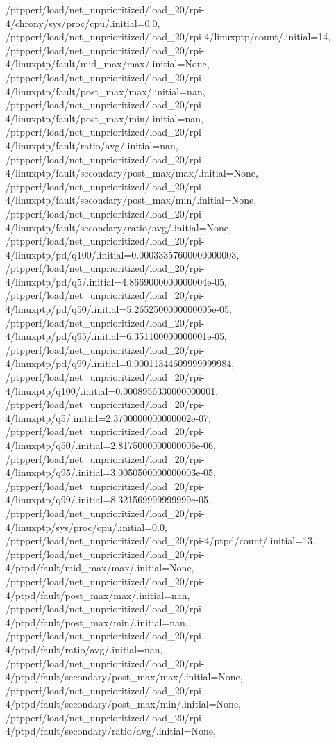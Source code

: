 {    /ptpperf/load/net_unprioritized/load_20/rpi-4/chrony/sys/proc/cpu/.initial=0.0,
    /ptpperf/load/net_unprioritized/load_20/rpi-4/linuxptp/count/.initial=14,
    /ptpperf/load/net_unprioritized/load_20/rpi-4/linuxptp/fault/mid_max/max/.initial=None,
    /ptpperf/load/net_unprioritized/load_20/rpi-4/linuxptp/fault/post_max/max/.initial=nan,
    /ptpperf/load/net_unprioritized/load_20/rpi-4/linuxptp/fault/post_max/min/.initial=nan,
    /ptpperf/load/net_unprioritized/load_20/rpi-4/linuxptp/fault/ratio/avg/.initial=nan,
    /ptpperf/load/net_unprioritized/load_20/rpi-4/linuxptp/fault/secondary/post_max/max/.initial=None,
    /ptpperf/load/net_unprioritized/load_20/rpi-4/linuxptp/fault/secondary/post_max/min/.initial=None,
    /ptpperf/load/net_unprioritized/load_20/rpi-4/linuxptp/fault/secondary/ratio/avg/.initial=None,
    /ptpperf/load/net_unprioritized/load_20/rpi-4/linuxptp/pd/q100/.initial=0.00033357600000000003,
    /ptpperf/load/net_unprioritized/load_20/rpi-4/linuxptp/pd/q5/.initial=4.8669000000000004e-05,
    /ptpperf/load/net_unprioritized/load_20/rpi-4/linuxptp/pd/q50/.initial=5.2652500000000005e-05,
    /ptpperf/load/net_unprioritized/load_20/rpi-4/linuxptp/pd/q95/.initial=6.351100000000001e-05,
    /ptpperf/load/net_unprioritized/load_20/rpi-4/linuxptp/pd/q99/.initial=0.00011344609999999984,
    /ptpperf/load/net_unprioritized/load_20/rpi-4/linuxptp/q100/.initial=0.0008956330000000001,
    /ptpperf/load/net_unprioritized/load_20/rpi-4/linuxptp/q5/.initial=2.3700000000000002e-07,
    /ptpperf/load/net_unprioritized/load_20/rpi-4/linuxptp/q50/.initial=2.8175000000000006e-06,
    /ptpperf/load/net_unprioritized/load_20/rpi-4/linuxptp/q95/.initial=3.0050500000000003e-05,
    /ptpperf/load/net_unprioritized/load_20/rpi-4/linuxptp/q99/.initial=8.321569999999999e-05,
    /ptpperf/load/net_unprioritized/load_20/rpi-4/linuxptp/sys/proc/cpu/.initial=0.0,
    /ptpperf/load/net_unprioritized/load_20/rpi-4/ptpd/count/.initial=13,
    /ptpperf/load/net_unprioritized/load_20/rpi-4/ptpd/fault/mid_max/max/.initial=None,
    /ptpperf/load/net_unprioritized/load_20/rpi-4/ptpd/fault/post_max/max/.initial=nan,
    /ptpperf/load/net_unprioritized/load_20/rpi-4/ptpd/fault/post_max/min/.initial=nan,
    /ptpperf/load/net_unprioritized/load_20/rpi-4/ptpd/fault/ratio/avg/.initial=nan,
    /ptpperf/load/net_unprioritized/load_20/rpi-4/ptpd/fault/secondary/post_max/max/.initial=None,
    /ptpperf/load/net_unprioritized/load_20/rpi-4/ptpd/fault/secondary/post_max/min/.initial=None,
    /ptpperf/load/net_unprioritized/load_20/rpi-4/ptpd/fault/secondary/ratio/avg/.initial=None,
}
